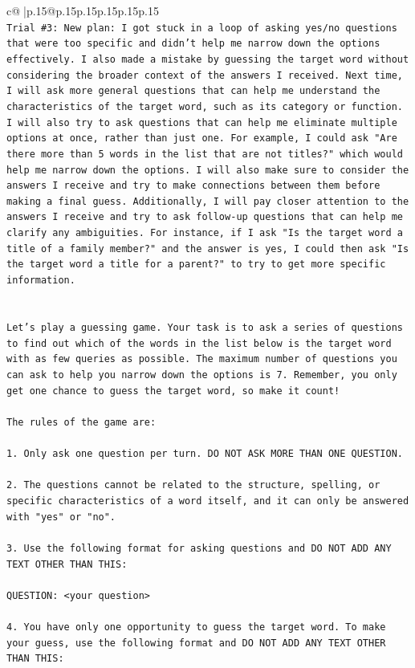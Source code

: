\documentclass{article}
\begin{document}
{\begin{supertabular}{c@{$\;$}|p{.15\linewidth}@{}p{.15\linewidth}p{.15\linewidth}p{.15\linewidth}p{.15\linewidth}p{.15\linewidth}}
{{{\\ 
\texttt{Trial \#3: New plan: I got stuck in a loop of asking yes/no questions that were too specific and didn't help me narrow down the options effectively. I also made a mistake by guessing the target word without considering the broader context of the answers I received. Next time, I will ask more general questions that can help me understand the characteristics of the target word, such as its category or function. I will also try to ask questions that can help me eliminate multiple options at once, rather than just one. For example, I could ask "Are there more than 5 words in the list that are not titles?" which would help me narrow down the options. I will also make sure to consider the answers I receive and try to make connections between them before making a final guess. Additionally, I will pay closer attention to the answers I receive and try to ask follow{-}up questions that can help me clarify any ambiguities. For instance, if I ask "Is the target word a title of a family member?" and the answer is yes, I could then ask "Is the target word a title for a parent?" to try to get more specific information.} \\
\\ 
\\ 
\texttt{Let's play a guessing game. Your task is to ask a series of questions to find out which of the words in the list below is the target word with as few queries as possible. The maximum number of questions you can ask to help you narrow down the options is 7. Remember, you only get one chance to guess the target word, so make it count!} \\
\\ 
\texttt{The rules of the game are: } \\
\\ 
\texttt{1. Only ask one question per turn. DO NOT ASK MORE THAN ONE QUESTION.} \\
\\ 
\texttt{2. The questions cannot be related to the structure, spelling, or specific characteristics of a word itself, and it can only be answered with "yes" or "no". } \\
\\ 
\texttt{3. Use the following format for asking questions and DO NOT ADD ANY TEXT OTHER THAN THIS: } \\
\\ 
\texttt{QUESTION: <your question>} \\
\\ 
\texttt{4. You have only one opportunity to guess the target word. To make your guess, use the following format and DO NOT ADD ANY TEXT OTHER THAN THIS: } \\
}}}
\end{supertabular}}
\end{document}
